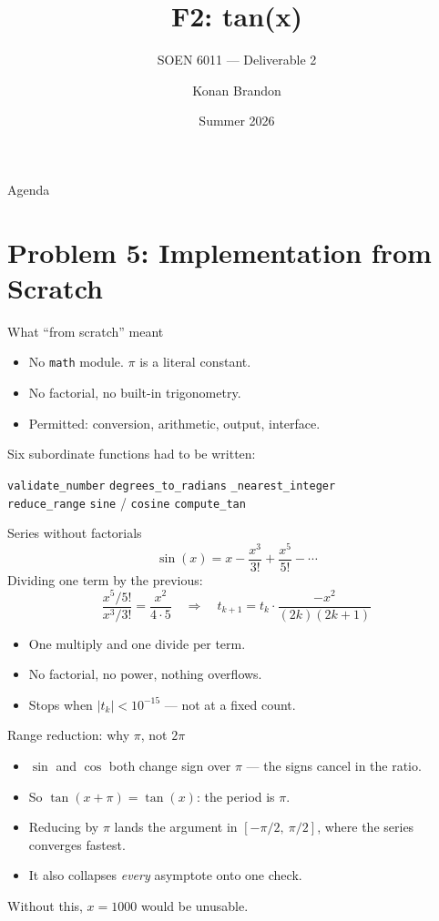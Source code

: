 \documentclass{beamer}
\title{F2: tan(x)}
\subtitle{SOEN 6011 --- Deliverable 2}
\author{Konan Brandon}
\institute{Student ID: 40373534\\[0.3cm]
\small\url{https://github.com/Brand0-code/soen6011-tan-calculator}}
\date{Summer 2026}
\begin{document}
\frame{\titlepage}

\begin{frame}{Agenda}
  \tableofcontents
\end{frame}

\section{Problem 5: Implementation from Scratch}

\begin{frame}{What ``from scratch'' meant}
  \begin{itemize}
    \item No \texttt{math} module. $\pi$ is a literal constant.
    \item No factorial, no built-in trigonometry.
    \item Permitted: conversion, arithmetic, output, interface.
  \end{itemize}
  \vfill
  Six subordinate functions had to be written:
  \begin{center}
  \small
  \texttt{validate\_number} \quad \texttt{degrees\_to\_radians} \quad
  \texttt{\_nearest\_integer}\\
  \texttt{reduce\_range} \quad \texttt{sine} / \texttt{cosine} \quad
  \texttt{compute\_tan}
  \end{center}
\end{frame}

\begin{frame}{Series without factorials}
  \[
    \sin(x) = x - \frac{x^{3}}{3!} + \frac{x^{5}}{5!} - \cdots
  \]
  Dividing one term by the previous:
  \[
    \frac{x^{5}/5!}{x^{3}/3!} = \frac{x^{2}}{4\cdot 5}
    \quad\Longrightarrow\quad
    t_{k+1} = t_{k}\cdot\frac{-x^{2}}{(2k)(2k+1)}
  \]
  \begin{itemize}
    \item One multiply and one divide per term.
    \item No factorial, no power, nothing overflows.
    \item Stops when $|t_k| < 10^{-15}$ --- not at a fixed count.
  \end{itemize}
\end{frame}

\begin{frame}{Range reduction: why $\pi$, not $2\pi$}
  \begin{itemize}
    \item $\sin$ and $\cos$ both change sign over $\pi$ ---
          the signs cancel in the ratio.
    \item So $\tan(x + \pi) = \tan(x)$: the period is $\pi$.
    \item Reducing by $\pi$ lands the argument in
          $[-\pi/2,\ \pi/2]$, where the series converges fastest.
    \item It also collapses \emph{every} asymptote onto one check.
  \end{itemize}
  \vfill
  \begin{center}
    Without this, $x = 1000$ would be unusable.
  \end{center}
\end{frame}
\end{document}
